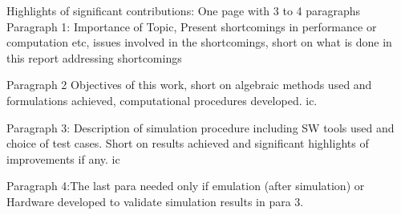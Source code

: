 \vspace{-1cm}


Highlights of significant contributions: One page with 3 to 4 paragraphs\\

Paragraph 1: Importance of Topic, Present shortcomings in performance or computation etc, issues involved in the shortcomings, short on what is done in this report addressing shortcomings


Paragraph 2 Objectives of this work, short on algebraic methods used and formulations achieved, computational procedures developed. \gls{ic}.


Paragraph 3: Description of simulation procedure including SW tools used and choice of test cases. Short on results achieved and significant highlights of improvements if any.
\gls{ic}

Paragraph 4:The last para needed only if emulation (after simulation) or Hardware developed to validate simulation results in para 3. 

\pagebreak